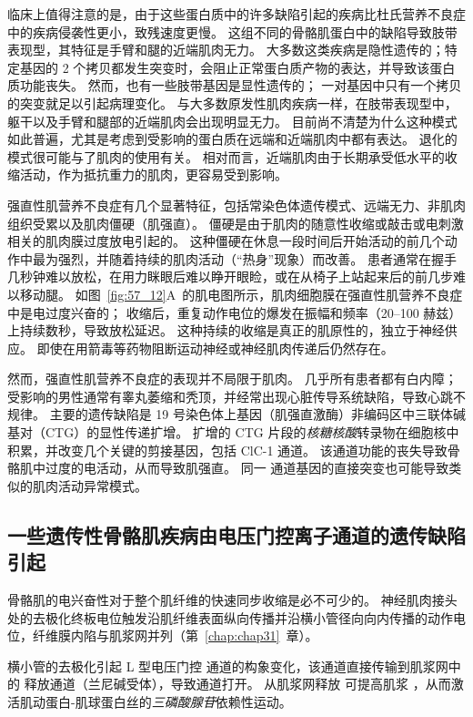 临床上值得注意的是，由于这些蛋白质中的许多缺陷引起的疾病比杜氏营养不良症中的疾病侵袭性更小，致残速度更慢。
这组不同的骨骼肌蛋白中的缺陷导致肢带表现型，其特征是手臂和腿的近端肌肉无力。
大多数这类疾病是隐性遗传的；特定基因的 2 个拷贝都发生突变时，会阻止正常蛋白质产物的表达，并导致该蛋白质功能丧失。
然而，也有一些肢带基因是显性遗传的；
一对基因中只有一个拷贝的突变就足以引起病理变化。
与大多数原发性肌肉疾病一样，在肢带表现型中，躯干以及手臂和腿部的近端肌肉会出现明显无力。
目前尚不清楚为什么这种模式如此普遍，尤其是考虑到受影响的蛋白质在远端和近端肌肉中都有表达。
退化的模式很可能与了肌肉的使用有关。
相对而言，近端肌肉由于长期承受低水平的收缩活动，作为抵抗重力的肌肉，更容易受到影响。


强直性肌营养不良症有几个显著特征，包括常染色体遗传模式、远端无力、非肌肉组织受累以及肌肉僵硬（肌强直）。
僵硬是由于肌肉的随意性收缩或敲击或电刺激相关的肌肉膜过度放电引起的。
这种僵硬在休息一段时间后开始活动的前几个动作中最为强烈，并随着持续的肌肉活动（“热身”现象）而改善。
患者通常在握手几秒钟难以放松，在用力眯眼后难以睁开眼睑，或在从椅子上站起来后的前几步难以移动腿。
如图~\ref{fig:57_12}A~的肌电图所示，肌肉细胞膜在强直性肌营养不良症中是电过度兴奋的；
收缩后，重复动作电位的爆发在振幅和频率（20–100 赫兹）上持续数秒，导致放松延迟。
这种持续的收缩是真正的肌原性的，独立于神经供应。
即使在用箭毒等药物阻断运动神经或神经肌肉传递后仍然存在。


然而，强直性肌营养不良症的表现并不局限于肌肉。
几乎所有患者都有白内障；
受影响的男性通常有睾丸萎缩和秃顶，并经常出现心脏传导系统缺陷，导致心跳不规律。
主要的遗传缺陷是 19 号染色体上基因（肌强直激酶）非编码区中三联体碱基对（CTG）的显性传递扩增。
扩增的 CTG 片段的\textit{核糖核酸}转录物在细胞核中积累，并改变几个关键的剪接基因，包括 ClC-1  通道。
该通道功能的丧失导致骨骼肌中过度的电活动，从而导致肌强直。
同一  通道基因的直接突变也可能导致类似的肌肉活动异常模式。



\subsection{一些遗传性骨骼肌疾病由电压门控离子通道的遗传缺陷引起}

骨骼肌的电兴奋性对于整个肌纤维的快速同步收缩是必不可少的。
神经肌肉接头处的去极化终板电位触发沿肌纤维表面纵向传播并沿横小管径向向内传播的动作电位，纤维膜内陷与肌浆网并列（第~\ref{chap:chap31}~章）。


横小管的去极化引起 L 型电压门控  通道的构象变化，该通道直接传输到肌浆网中的  释放通道（兰尼碱受体），导致通道打开。
从肌浆网释放  可提高肌浆 ，从而激活肌动蛋白-肌球蛋白丝的\textit{三磷酸腺苷}依赖性运动。


